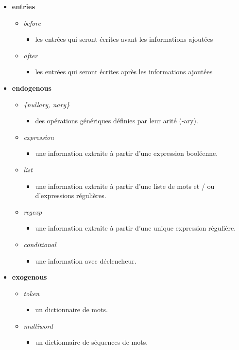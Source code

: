 \documentclass[manual-fr.tex]{subfiles}
\begin{document}
\begin{itemize}
	\item[] \textbf{entries}
	\begin{itemize}
		\item[] \textit{before}
			\begin{itemize}
				\item[] les entrées qui seront écrites avant les informations ajoutées
			\end{itemize}
		\item[] \textit{after}
			\begin{itemize}
				\item[] les entrées qui seront écrites après les informations ajoutées
			\end{itemize}
	\end{itemize}
	\item[] \textbf{endogenous}
	\begin{itemize}
		\item[] \textit{\{nullary, nary\}}
			\begin{itemize}
				\item[] des opérations génériques définies par leur arité (-ary).
			\end{itemize}
		\item[] \textit{expression}
			\begin{itemize}
				\item[] une information extraite à partir d'une expression booléenne.
			\end{itemize}
		\item[] \textit{list}
			\begin{itemize}
				\item[] une information extraite à partir d'une liste de mots et / ou d'expressions régulières.
			\end{itemize}
		\item[] \textit{regexp}
			\begin{itemize}
				\item[] une information extraite à partir d'une unique expression régulière.
			\end{itemize}
		\item[] \textit{conditional}
			\begin{itemize}
				\item[] une information avec déclencheur.
			\end{itemize}
	\end{itemize}
	\item[] \textbf{exogenous}
	\begin{itemize}
		\item[] \textit{token}
			\begin{itemize}
				\item[] un dictionnaire de mots.
			\end{itemize}
		\item[] \textit{multiword}
			\begin{itemize}
				\item[] un dictionnaire de séquences de mots.
			\end{itemize}
	\end{itemize}
\end{itemize}
\end{document}
